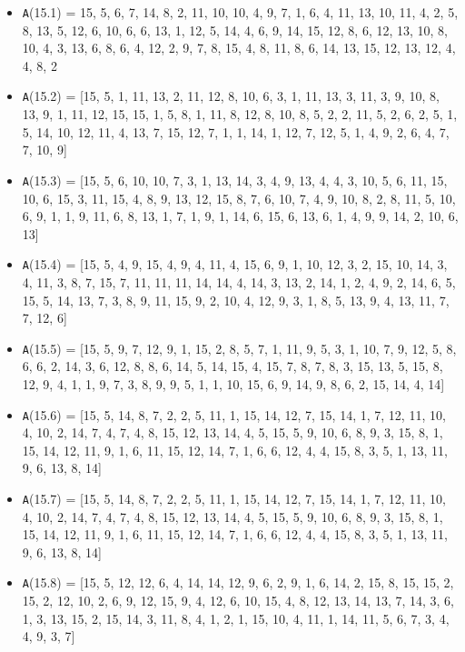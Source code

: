 \documentclass[runningheads, a4paper]{llncs}
\begin{document}
\begin{itemize}
	\item {\texttt A(15.1) = } 15, 5, 6, 7, 14, 8, 2, 11, 10, 10, 4, 9, 7, 1, 6, 4, 11, 13, 10, 11, 4, 2, 5, 8, 13, 5, 12, 6, 10, 6, 6, 13, 1, 12, 5, 14, 4, 6, 9, 14, 15, 12, 8, 6, 12, 13, 10, 8, 10, 4, 3, 13, 6, 8, 6, 4, 12, 2, 9, 7, 8, 15, 4, 8, 11, 8, 6, 14, 13, 15, 12, 13, 12, 4, 4, 8, 2
	\item {\texttt A(15.2) = } [15, 5, 1, 11, 13, 2, 11, 12, 8, 10, 6, 3, 1, 11, 13, 3, 11, 3, 9, 10, 8, 13, 9, 1, 11, 12, 15, 15, 1, 5, 8, 1, 11, 8, 12, 8, 10, 8, 5, 2, 2, 11, 5, 2, 6, 2, 5, 1, 5, 14, 10, 12, 11, 4, 13, 7, 15, 12, 7, 1, 1, 14, 1, 12, 7, 12, 5, 1, 4, 9, 2, 6, 4, 7, 7, 10, 9]
	\item {\texttt A(15.3) = } [15, 5, 6, 10, 10, 7, 3, 1, 13, 14, 3, 4, 9, 13, 4, 4, 3, 10, 5, 6, 11, 15, 10, 6, 15, 3, 11, 15, 4, 8, 9, 13, 12, 15, 8, 7, 6, 10, 7, 4, 9, 10, 8, 2, 8, 11, 5, 10, 6, 9, 1, 1, 9, 11, 6, 8, 13, 1, 7, 1, 9, 1, 14, 6, 15, 6, 13, 6, 1, 4, 9, 9, 14, 2, 10, 6, 13]
	\item {\texttt A(15.4) = } [15, 5, 4, 9, 15, 4, 9, 4, 11, 4, 15, 6, 9, 1, 10, 12, 3, 2, 15, 10, 14, 3, 4, 11, 3, 8, 7, 15, 7, 11, 11, 11, 14, 14, 4, 14, 3, 13, 2, 14, 1, 2, 4, 9, 2, 14, 6, 5, 15, 5, 14, 13, 7, 3, 8, 9, 11, 15, 9, 2, 10, 4, 12, 9, 3, 1, 8, 5, 13, 9, 4, 13, 11, 7, 7, 12, 6]
	\item {\texttt A(15.5) = } [15, 5, 9, 7, 12, 9, 1, 15, 2, 8, 5, 7, 1, 11, 9, 5, 3, 1, 10, 7, 9, 12, 5, 8, 6, 6, 2, 14, 3, 6, 12, 8, 8, 6, 14, 5, 14, 15, 4, 15, 7, 8, 7, 8, 3, 15, 13, 5, 15, 8, 12, 9, 4, 1, 1, 9, 7, 3, 8, 9, 9, 5, 1, 1, 10, 15, 6, 9, 14, 9, 8, 6, 2, 15, 14, 4, 14]
	\item {\texttt A(15.6) = } [15, 5, 14, 8, 7, 2, 2, 5, 11, 1, 15, 14, 12, 7, 15, 14, 1, 7, 12, 11, 10, 4, 10, 2, 14, 7, 4, 7, 4, 8, 15, 12, 13, 14, 4, 5, 15, 5, 9, 10, 6, 8, 9, 3, 15, 8, 1, 15, 14, 12, 11, 9, 1, 6, 11, 15, 12, 14, 7, 1, 6, 6, 12, 4, 4, 15, 8, 3, 5, 1, 13, 11, 9, 6, 13, 8, 14]
	\item {\texttt A(15.7) = } [15, 5, 14, 8, 7, 2, 2, 5, 11, 1, 15, 14, 12, 7, 15, 14, 1, 7, 12, 11, 10, 4, 10, 2, 14, 7, 4, 7, 4, 8, 15, 12, 13, 14, 4, 5, 15, 5, 9, 10, 6, 8, 9, 3, 15, 8, 1, 15, 14, 12, 11, 9, 1, 6, 11, 15, 12, 14, 7, 1, 6, 6, 12, 4, 4, 15, 8, 3, 5, 1, 13, 11, 9, 6, 13, 8, 14]
	\item {\texttt A(15.8) = } [15, 5, 12, 12, 6, 4, 14, 14, 12, 9, 6, 2, 9, 1, 6, 14, 2, 15, 8, 15, 15, 2, 15, 2, 12, 10, 2, 6, 9, 12, 15, 9, 4, 12, 6, 10, 15, 4, 8, 12, 13, 14, 13, 7, 14, 3, 6, 1, 3, 13, 15, 2, 15, 14, 3, 11, 8, 4, 1, 2, 1, 15, 10, 4, 11, 1, 14, 11, 5, 6, 7, 3, 4, 4, 9, 3, 7]

\end{itemize}
\end{document}
